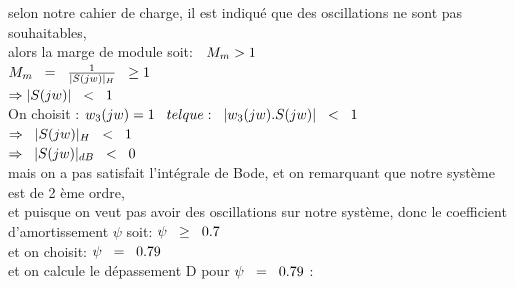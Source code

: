 \documentclass[12pt, a4paper, openany]{report}
\begin{document}
selon notre cahier de charge, il est indiqué que des oscillations ne sont pas souhaitables,\\

alors la marge de module soit: $\hspace{0.2cm} M_{m}>1$\\

$M_{m}\hspace{0.2cm}=\hspace{0.2cm}\frac {1}{|S(jw)|_{H}}\hspace{0.2cm}\geq 1$ \\

$\Rightarrow |S(jw)|\hspace{0.2cm} < \hspace{0.2cm} 1 $ \\

On choisit :  $w_{3}(jw)=1 \hspace{0.3cm} tel que: \hspace{0.2cm} |w_{3}(jw).S(jw)|\hspace{0.2cm}<\hspace{0.2cm} 1$ \\
  
   $\Rightarrow \hspace{0.2cm} |S(jw)|_{H}\hspace{0.2cm}< \hspace{0.2cm} 1$ \\

 $\Rightarrow \hspace{0.2cm} |S(jw)|_{dB} \hspace{0.2cm}< \hspace{0.2cm} 0$ \\
 
mais on a pas satisfait l'intégrale de Bode, et on remarquant que notre système est de 2 ème ordre,\\

et puisque on veut pas avoir des oscillations sur notre système, donc le coefficient d'amortissement $\psi$ soit: $\psi \hspace{0.2cm}\geq \hspace{0.2cm} 0.7$ \\

et on choisit: $\psi \hspace{0.2cm} = \hspace{0.2cm} 0.79$ \\

et on calcule le dépassement D pour $\psi \hspace{0.2cm} = \hspace{0.2cm} 0.79$ :\\
\end{document}
